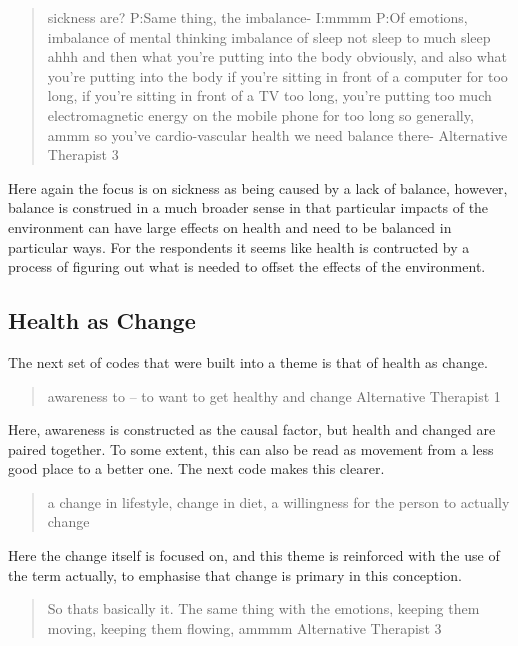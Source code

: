 \begin{quotation}
  sickness are?
P:Same thing, the imbalance-
I:mmmm
P:Of emotions, imbalance of mental thinking imbalance of sleep not sleep to much sleep ahhh and then what you're putting into the body obviously, and also what you're putting into the body if you're sitting in front of a computer for too long, if you're sitting in front of a TV too long, you're putting too much electromagnetic energy on the mobile phone for too long so generally, ammm so you've cardio-vascular health we need balance there-
Alternative Therapist 3
\end{quotation}

Here again the focus is on sickness as being caused by a lack of balance, however, balance is construed in a much broader sense in that particular impacts of the environment can have large effects on health and need to be balanced in particular ways. For the respondents it seems like health is contructed by a process of figuring out what is needed to offset the effects of the environment. 


\subsection{Health as Change}
\label{sec:health-as-change}

The next set of codes that were built into a theme is that of health as change. 

\begin{quotation}
  awareness to – to want to get healthy and change 
  Alternative Therapist 1
\end{quotation}

Here, awareness is constructed as the causal factor, but health and changed are paired together. To some extent, this can also be read as movement from a less good place to a better one. 
The next code makes this clearer.

\begin{quotation}
  a change in lifestyle, change in diet, a willingness for the person to actually change 

\end{quotation}

Here the change itself is focused on, and this theme is reinforced with the use of the term actually, to emphasise that change is primary in this conception. 

\begin{quotation}
  So thats basically it. The same thing with the emotions, keeping them moving, keeping them flowing, ammmm 
Alternative Therapist 3
\end{quotation}

